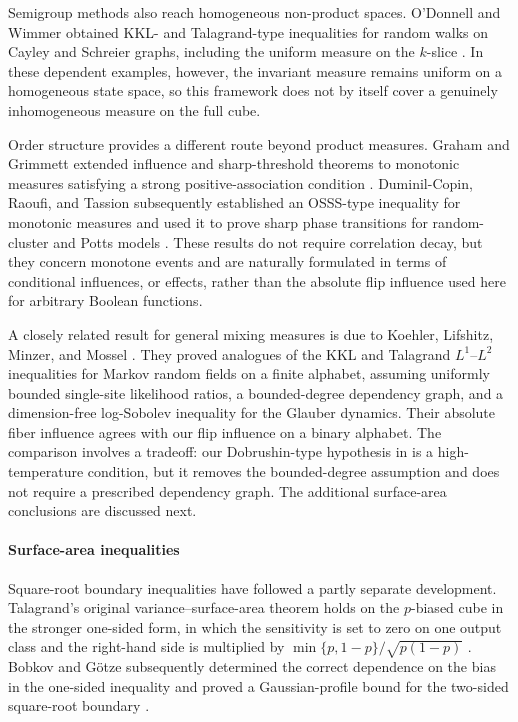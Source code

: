 Semigroup methods also reach homogeneous non-product spaces. O'Donnell and Wimmer obtained KKL- and Talagrand-type inequalities for random walks on Cayley and Schreier graphs, including the uniform measure on the $k$-slice \cite{ODonnellWimmer13,ODonnellWimmerSharp13}. In these dependent examples, however, the invariant measure remains uniform on a homogeneous state space, so this framework does not by itself cover a genuinely inhomogeneous measure on the full cube.

Order structure provides a different route beyond product measures. Graham and Grimmett extended influence and sharp-threshold theorems to monotonic measures satisfying a strong positive-association condition \cite{GrahamGrimmett06}. Duminil-Copin, Raoufi, and Tassion subsequently established an OSSS-type inequality for monotonic measures and used it to prove sharp phase transitions for random-cluster and Potts models \cite{DuminilCopinRaoufiTassion19}. These results do not require correlation decay, but they concern monotone events and are naturally formulated in terms of conditional influences, or effects, rather than the absolute flip influence used here for arbitrary Boolean functions.

A closely related result for general mixing measures is due to Koehler, Lifshitz, Minzer, and Mossel \cite{KoehlerLifshitzMinzerMossel23}. They proved analogues of the KKL and Talagrand $L^1$--$L^2$ inequalities for Markov random fields on a finite alphabet, assuming uniformly bounded single-site likelihood ratios, a bounded-degree dependency graph, and a dimension-free log-Sobolev inequality for the Glauber dynamics. Their absolute fiber influence agrees with our flip influence on a binary alphabet. The comparison involves a tradeoff: our Dobrushin-type hypothesis in  is a high-temperature condition, but it removes the bounded-degree assumption and does not require a prescribed dependency graph. The additional surface-area conclusions are discussed next.

\paragraph{Surface-area inequalities}
Square-root boundary inequalities have followed a partly separate development. Talagrand's original variance--surface-area theorem holds on the $p$-biased cube in the stronger one-sided form, in which the sensitivity is set to zero on one output class and the right-hand side is multiplied by $\min\{p,1-p\}/\sqrt{p(1-p)}$ \cite{Talagrand93}. Bobkov and G\"otze subsequently determined the correct dependence on the bias in the one-sided inequality and proved a Gaussian-profile bound for the two-sided square-root boundary \cite{BobkovGotze99}.

